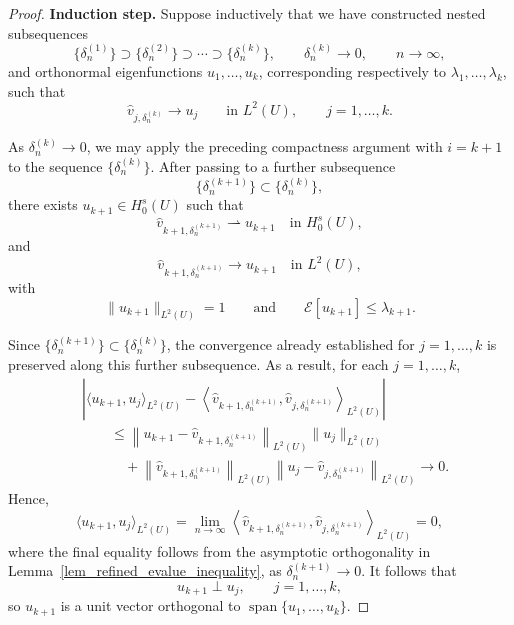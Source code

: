 \documentclass[preprint,12pt]{elsarticle}
\begin{document}
{\begin{proof}
\textbf{Induction step.}
Suppose inductively that we have constructed nested subsequences
\[
    \{\delta_n^{(1)}\}
    \supset
    \{\delta_n^{(2)}\}
    \supset\cdots\supset
    \{\delta_n^{(k)}\},
    \qquad
    \delta_n^{(k)}\to0,\qquad n\to\infty,
\]
and orthonormal eigenfunctions $u_1,\ldots,u_k$, corresponding
respectively to $\lambda_1,\ldots,\lambda_k$, such that
\[
    \hat v_{j,\delta_n^{(k)}}
    \longrightarrow u_j
    \qquad\text{in }L^2(U),
    \qquad j=1,\ldots,k.
\]

As $\delta_n^{(k)}\to0$, we may apply the preceding compactness
argument with $i=k+1$ to the sequence $\{\delta_n^{(k)}\}$.
After passing to a further subsequence
\[
    \{\delta_n^{(k+1)}\}
    \subset
    \{\delta_n^{(k)}\},
\]
there exists $u_{k+1}\in H_0^s(U)$ such that
\[
    \hat v_{k+1,\delta_n^{(k+1)}}
    \rightharpoonup u_{k+1}
    \quad\text{in }H_0^s(U),
\]
and
\[
    \hat v_{k+1,\delta_n^{(k+1)}}
    \longrightarrow u_{k+1}
    \quad\text{in }L^2(U),
\]
with
\[
    \|u_{k+1}\|_{L^2(U)}=1
    \qquad\text{and}\qquad
    \mathcal E[u_{k+1}]
    \leq\lambda_{k+1}.
\]

Since $\{\delta_n^{(k+1)}\}\subset\{\delta_n^{(k)}\}$, the convergence already established for
$j=1,\ldots,k$ is preserved along this further subsequence. As a result, for each $j=1,\ldots,k$,
\begin{align*}
&\left|
    \langle u_{k+1},u_j\rangle_{L^2(U)}
    -
    \left\langle
        \hat v_{k+1,\delta_n^{(k+1)}},
        \hat v_{j,\delta_n^{(k+1)}}
    \right\rangle_{L^2(U)}
\right|\\
&\qquad\leq
    \left\|
        u_{k+1}
        -
        \hat v_{k+1,\delta_n^{(k+1)}}
    \right\|_{L^2(U)}
    \|u_j\|_{L^2(U)}
\\
&\qquad\quad+
    \left\|
        \hat v_{k+1,\delta_n^{(k+1)}}
    \right\|_{L^2(U)}
    \left\|
        u_j
        -
        \hat v_{j,\delta_n^{(k+1)}}
    \right\|_{L^2(U)}
    \longrightarrow0.
\end{align*}
Hence,
\[
    \langle u_{k+1},u_j\rangle_{L^2(U)}
    =
    \lim_{n\to\infty}
    \left\langle
        \hat v_{k+1,\delta_n^{(k+1)}},
        \hat v_{j,\delta_n^{(k+1)}}
    \right\rangle_{L^2(U)}
    =0,
\]
where the final equality follows from the asymptotic orthogonality
in Lemma~\ref{lem_refined_evalue_inequality}, as
$\delta_n^{(k+1)}\to0$. It follows that
\[
    u_{k+1}\perp u_j,
    \qquad j=1,\ldots,k,
\]
so $u_{k+1}$ is a unit vector orthogonal to
$\operatorname{span}\{u_1,\ldots,u_k\}$.


\end{proof}}
\end{document}
